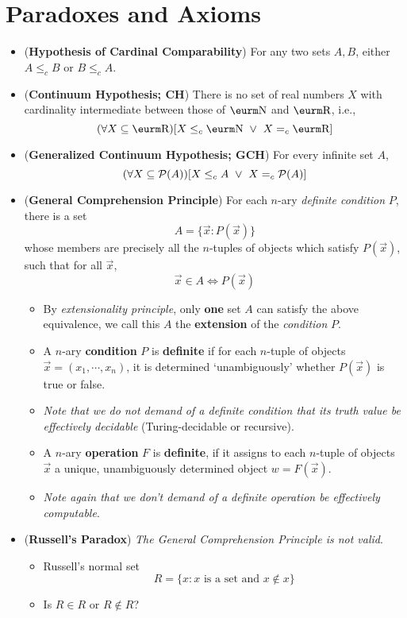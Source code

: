 \documentclass{myproc}
\begin{document}
\section{Paradoxes and Axioms}
\begin{itemize}
\item ({\bf{}Hypothesis of Cardinal Comparability})
	For any two sets $A, B$, either $A \le_c B$ or $B \le_c A$.
\item ({\bf{}Continuum Hypothesis; CH})
	There is no set of real numbers $X$ with cardinality
	intermediate between those of $\N$ and $\R$, i.e.,
	\[ (\forall{X} \subseteq {\R})[X \le_c {\N} \ \vee\ X =_c \R] \]
\item ({\bf{}Generalized Continuum Hypothesis; GCH})
		For every infinite set $A$,
		\[ (\forall{X} \subseteq {\cal{}P}(A))[X \le_c A\ \vee\ X =_c {\cal{}P}(A)]\]
\item ({\bf{}General Comprehension Principle}) For each $n$-ary
	{\em{}definite condition\/} $P$, 
		there is a set 
			\[A = \{\vec{x}: P(\vec{x})\} \]
		whose members are precisely all the $n$-tuples of objects
		which satisfy $P(\vec{x})$, such that for all $\vec{x}$,
			\[ \vec{x} \in A \Leftrightarrow P(\vec{x})\]

		\begin{itemize}
		\item By {\em{}extensionality principle}, only {\bf{}one} 
			set $A$	can satisfy the above equivalence, we call 
			this $A$ the {\bf{}extension} of 
			the {\em{}condition\/} $P$.
		\item A $n$-ary {\bf{}condition} $P$ is {\bf{}definite}  if 
			for each
			$n$-tuple of objects $\vec{x} = (x_1, \cdots, x_n)$, 
			it is
			determined `unambiguously' whether 
			$P(\vec{x})$ is
			true or false.
		\item {\em{}Note that we do not demand of a definite 
			condition that its 
			truth value be {\em{}effectively decidable\/}}
			(Turing-decidable or recursive).
		\item A $n$-ary {\bf{}operation} $F$ is {\bf{}definite}, if it
			assigns to each $n$-tuple of objects $\vec{x}$ a
				unique, unambiguously determined object
				$w = F(\vec{x})$.
		\item {\em{}Note again that we don't demand of a definite 
			operation
			be {\em{}effectively computable\/}}.
		\end{itemize}
\item ({\bf{}Russell's Paradox}) {\em{}The 
	General Comprehension Principle is not valid\/}.
		\begin{itemize}
		\item Russell's normal set
			\[ R = \{x : \mbox{$x$ is a set and\ } x \not\in x\}\]
		\item Is $R \in R$ or $R \not\in R$?
		\end{itemize}
\end{itemize}
\end{document}
